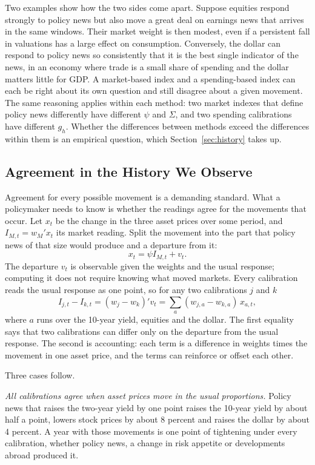 Two examples show how the two sides come apart. Suppose equities respond strongly to policy news but also move a great deal on earnings news that arrives in the same windows. Their market weight is then modest, even if a persistent fall in valuations has a large effect on consumption. Conversely, the dollar can respond to policy news so consistently that it is the best single indicator of the news, in an economy where trade is a small share of spending and the dollar matters little for GDP. A market-based index and a spending-based index can each be right about its own question and still disagree about a given movement. The same reasoning applies within each method: two market indexes that define policy news differently have different $\psi$ and $\Sigma$, and two spending calibrations have different $g_h$. Whether the differences between methods exceed the differences within them is an empirical question, which Section~\ref{sec:history} takes up.

\subsection{Agreement in the History We Observe}\label{sec:observed}
Agreement for every possible movement is a demanding standard. What a policymaker needs to know is whether the readings agree for the movements that occur. Let $x_t$ be the change in the three asset prices over some period, and $I_{M,t}=w_M'x_t$ its market reading. Split the movement into the part that policy news of that size would produce and a departure from it:
\begin{equation}\label{eq:rem}
x_t=\psi I_{M,t}+v_t .
\end{equation}
The departure $v_t$ is observable given the weights and the usual response; computing it does not require knowing what moved markets. Every calibration reads the usual response as one point, so for any two calibrations $j$ and $k$
\begin{equation}\label{eq:D}
I_{j,t}-I_{k,t}=(w_j-w_k)'v_t=\sum_{a}(w_{j,a}-w_{k,a})\,x_{a,t},
\end{equation}
where $a$ runs over the 10-year yield, equities and the dollar. The first equality says that two calibrations can differ only on the departure from the usual response. The second is accounting: each term is a difference in weights times the movement in one asset price, and the terms can reinforce or offset each other.

Three cases follow.

\textit{All calibrations agree when asset prices move in the usual proportions.} Policy news that raises the two-year yield by one point raises the 10-year yield by about half a point, lowers stock prices by about 8 percent and raises the dollar by about 4 percent. A year with those movements is one point of tightening under every calibration, whether policy news, a change in risk appetite or developments abroad produced it.

